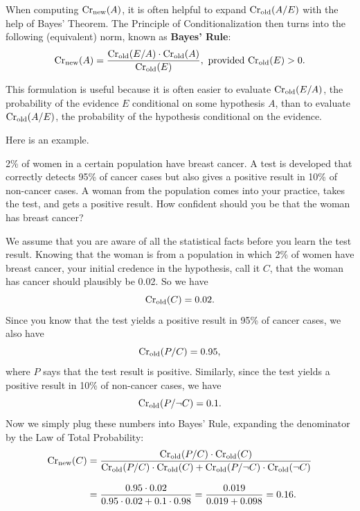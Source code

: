 
When computing $\text{Cr}_\text{new}(A)$, it is often helpful to expand
$\text{Cr}_\text{old}(A/E)$ with the help of Bayes' Theorem. The Principle of
Conditionalization then turns into the following (equivalent) norm, known as
\textbf{Bayes' Rule}:
%
\[
\text{Cr}_{\text{new}}(A) = \frac{\text{Cr}_{\text{old}}(E/A) \cdot \text{Cr}_{\text{old}}(A)}{\text{Cr}_{\text{old}}(E)}, \text{ provided $\text{Cr}_\text{old}(E) > 0$}.
\]

This formulation is useful because it is often easier to evaluate
$\text{Cr$_{\text{old}}$}(E/A)$, the probability of the evidence $E$ conditional on some hypothesis
$A$, than to evaluate $\text{Cr$_{\text{old}}$}(A/E)$, the probability of the hypothesis conditional
on the evidence.

Here is an example.
\begin{example}\label{ex:base}
  2\% of women in a certain population have breast cancer. A test is developed
  that correctly detects 95\% of cancer cases but also gives a positive
  result in 10\% of non-cancer cases. A woman from the population comes into
  your practice, takes the test, and gets a positive result. How confident
  should you be that the woman has breast cancer?
\end{example}

We assume that you are aware of all the statistical facts before you learn the
test result. Knowing that the woman is from a population in which 2\% of women
have breast cancer, your initial credence in the hypothesis, call it $C$, that
the woman has cancer should plausibly be 0.02. So we have
\[
  \text{Cr}_\text{old}(C) = 0.02.
\]
Since you know that the test yields a positive
result in 95\% of cancer cases, we also have
\[
  \text{Cr}_{\text{old}}(P/C) = 0.95,
\]
where $P$ says that the test result is positive. Similarly, since the test
yields a positive result in 10\% of non-cancer cases, we have
\[
  \text{Cr}_{\text{old}}(P/\neg C) = 0.1.
\]
Now we simply plug these numbers into Bayes' Rule, expanding the denominator by
the Law of Total Probability:
%
\begin{align*}
  \text{Cr}_{\text{new}}(C) &= \frac{\text{Cr}_{\text{old}}(P/C) \cdot
  \text{Cr}_{\text{old}}(C)}{\text{Cr}_\text{old}(P/C) \cdot \text{Cr}_\text{old}(C) +
  \text{Cr}_\text{old}(P/\neg C)\cdot \text{Cr}_\text{old}(\neg C)}\\[3mm]
  &= \frac{0.95 \cdot 0.02}{0.95 \cdot 0.02 + 0.1 \cdot 0.98} = \frac{0.019}{0.019 + 0.098} = 0.16.
\end{align*}

